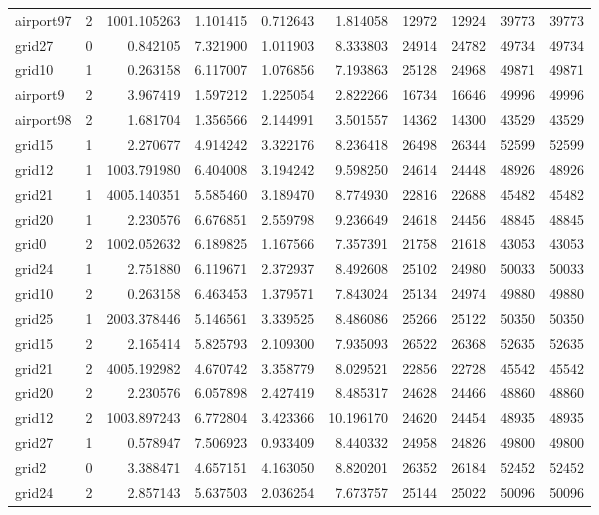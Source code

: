 \begin{longtable}{|l|r|r|r|r|r|r|r|r|r|}
airport97 & 2 & 1001.105263 & 1.101415 & 0.712643 & 1.814058 & 12972 & 12924 & 39773 & 39773 \\
grid27 & 0 & 0.842105 & 7.321900 & 1.011903 & 8.333803 & 24914 & 24782 & 49734 & 49734 \\
grid10 & 1 & 0.263158 & 6.117007 & 1.076856 & 7.193863 & 25128 & 24968 & 49871 & 49871 \\
airport9 & 2 & 3.967419 & 1.597212 & 1.225054 & 2.822266 & 16734 & 16646 & 49996 & 49996 \\
airport98 & 2 & 1.681704 & 1.356566 & 2.144991 & 3.501557 & 14362 & 14300 & 43529 & 43529 \\
grid15 & 1 & 2.270677 & 4.914242 & 3.322176 & 8.236418 & 26498 & 26344 & 52599 & 52599 \\
grid12 & 1 & 1003.791980 & 6.404008 & 3.194242 & 9.598250 & 24614 & 24448 & 48926 & 48926 \\
grid21 & 1 & 4005.140351 & 5.585460 & 3.189470 & 8.774930 & 22816 & 22688 & 45482 & 45482 \\
grid20 & 1 & 2.230576 & 6.676851 & 2.559798 & 9.236649 & 24618 & 24456 & 48845 & 48845 \\
grid0 & 2 & 1002.052632 & 6.189825 & 1.167566 & 7.357391 & 21758 & 21618 & 43053 & 43053 \\
grid24 & 1 & 2.751880 & 6.119671 & 2.372937 & 8.492608 & 25102 & 24980 & 50033 & 50033 \\
grid10 & 2 & 0.263158 & 6.463453 & 1.379571 & 7.843024 & 25134 & 24974 & 49880 & 49880 \\
grid25 & 1 & 2003.378446 & 5.146561 & 3.339525 & 8.486086 & 25266 & 25122 & 50350 & 50350 \\
grid15 & 2 & 2.165414 & 5.825793 & 2.109300 & 7.935093 & 26522 & 26368 & 52635 & 52635 \\
grid21 & 2 & 4005.192982 & 4.670742 & 3.358779 & 8.029521 & 22856 & 22728 & 45542 & 45542 \\
grid20 & 2 & 2.230576 & 6.057898 & 2.427419 & 8.485317 & 24628 & 24466 & 48860 & 48860 \\
grid12 & 2 & 1003.897243 & 6.772804 & 3.423366 & 10.196170 & 24620 & 24454 & 48935 & 48935 \\
grid27 & 1 & 0.578947 & 7.506923 & 0.933409 & 8.440332 & 24958 & 24826 & 49800 & 49800 \\
grid2 & 0 & 3.388471 & 4.657151 & 4.163050 & 8.820201 & 26352 & 26184 & 52452 & 52452 \\
grid24 & 2 & 2.857143 & 5.637503 & 2.036254 & 7.673757 & 25144 & 25022 & 50096 & 50096 \\

\end{longtable}
